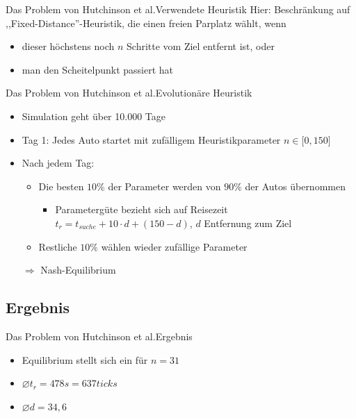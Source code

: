 \documentclass[11pt]{beamer}
\begin{document}
\begin{frame}{Das Problem von Hutchinson et al.}{Verwendete Heuristik}
Hier: Beschränkung auf ,,Fixed-Distance''-Heuristik, die einen freien Parplatz wählt, wenn
	\begin{itemize}
		\item dieser höchstens noch $n$ Schritte vom Ziel entfernt ist, oder
		\item man den Scheitelpunkt passiert hat
	\end{itemize}
\end{frame}

\begin{frame}{Das Problem von Hutchinson et al.}{Evolutionäre Heuristik}
\begin{itemize}
	\item Simulation geht über 10.000 Tage
	\item Tag 1: Jedes Auto startet mit zufälligem Heuristikparameter $n\in \lbrack 0,150 \rbrack$
	\item Nach jedem Tag:
	\pause
	\begin{itemize}
		\item Die besten $10\%$ der Parameter werden von $90\%$ der Autos übernommen
		\begin{itemize}
			\item Parametergüte bezieht sich auf Reisezeit $t_r = t_{suche}+10\cdot d + (150-d)$, $d$ Entfernung zum Ziel
		\end{itemize}
		\item Restliche $10\%$ wählen wieder zufällige Parameter
	\end{itemize}
	\item[$\Rightarrow$] Nash-Equilibrium
\end{itemize}
\end{frame}

\subsection{Ergebnis}

\begin{frame}{Das Problem von Hutchinson et al.}{Ergebnis}
	\begin{itemize}
		\item Equilibrium stellt sich ein für $n=31$
		\item $\varnothing t_r = 478s = 637 ticks$
		\item $\varnothing d = 34,6$
	\end{itemize}
\end{frame}
\end{document}
